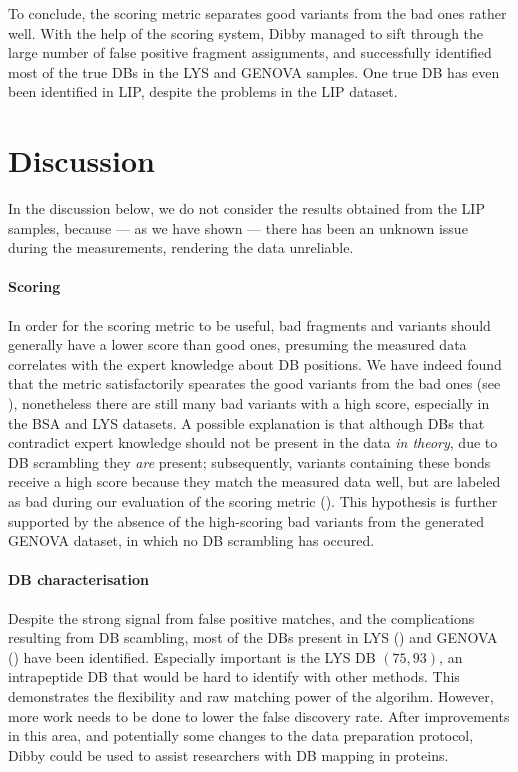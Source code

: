 To conclude, the scoring metric separates good variants from the bad ones rather well. With the help of the scoring system, Dibby managed to sift through the large number of false positive fragment assignments, and successfully identified most of the true DBs in the LYS and GENOVA samples. One true DB has even been identified in LIP, despite the problems in the LIP dataset.


\section{Discussion}

In the discussion below, we do not consider the results obtained from the LIP samples, because --- as we have shown --- there has been an unknown issue during the measurements, rendering the data unreliable.

\paragraph{Scoring} In order for the scoring metric to be useful, bad fragments and variants should generally have a lower score than good ones, presuming the measured data correlates with the expert knowledge about DB positions. We have indeed found that the metric satisfactorily spearates the good variants from the bad ones (see ), nonetheless there are still many bad variants with a high score, especially in the BSA and LYS datasets. A possible explanation is that although DBs that contradict expert knowledge should not be present in the data \emph{in theory}, due to DB scrambling they \emph{are} present; subsequently, variants containing these bonds receive a high score because they match the measured data well, but are labeled as bad during our evaluation of the scoring metric (). This hypothesis is further supported by the absence of the high-scoring bad variants from the generated GENOVA dataset, in which no DB scrambling has occured.

\paragraph{DB characterisation} Despite the strong signal from false positive matches, and the complications resulting from DB scambling, most of the DBs present in LYS () and GENOVA () have been identified. Especially important is the LYS DB \((75, 93)\), an intrapeptide DB that would be hard to identify with other methods. This demonstrates the flexibility and raw matching power of the algorihm. However, more work needs to be done to lower the false discovery rate. After improvements in this area, and potentially some changes to the data preparation protocol, Dibby could be used to assist researchers with DB mapping in proteins.

